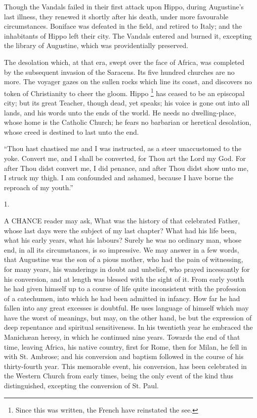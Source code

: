 Though the Vandals failed in their first attack upon Hippo, during
Augustine's last illness, they renewed it shortly after his death,
under more favourable circumstances. Boniface was defeated in the
field, and retired to Italy; and the inhabitants of Hippo left their
city. The Vandals entered and burned it, excepting the library of
Augustine, which was providentially preserved.

The desolation which, at that era, swept over the face of Africa,
was completed by the subsequent invasion of the Saracens. Its five
hundred churches are no more. The voyager gazes on the sullen rocks
which line its coast, and discovers no token of Christianity to cheer
the gloom. Hippo \footnote{Since this was written, the French have reinstated the see.}
has ceased to be an episcopal city; but its great Teacher, though
dead, yet speaks; his voice is gone out into all lands, and his words
unto the ends of the world. He needs no dwelling-place, whose home is
the Catholic Church; he fears no barbarian or heretical desolation,
whose creed is destined to last unto the end.


``Thou hast chastised me and I was instructed, as a steer
unaccustomed to the yoke. Convert me, and I shall be converted, for
Thou art the Lord my God. For after Thou didst convert me, I did
penance, and after Thou didst show unto me, I struck my thigh. I am
confounded and ashamed, because I have borne the reproach of my
youth.''

1.

A CHANCE reader may ask, What was the history
of that celebrated Father, whose last days were the subject of my last
chapter? What had his life been, what his early years, what his
labours? Surely he was no ordinary man, whose end, in all its
circumstances, is so impressive. We may answer in a few words, that
Augustine was the son of a pious mother, who had the pain of
witnessing, for many years, his wanderings in doubt and unbelief, who
prayed incessantly for his conversion, and at length was blessed with
the sight of it. From early youth he had given himself up to a course
of life quite inconsistent with the profession of a catechumen, into
which he had been admitted in infancy. How far he had fallen into any
great excesses is doubtful. He uses language of himself which may have
the worst of meanings, but may, on the other hand, be but the
expression of deep repentance and spiritual sensitiveness. In
his twentieth year he embraced the Manichæan heresy, in which he
continued nine years. Towards the end of that time, leaving Africa,
his native country, first for Rome, then for Milan, he fell in with
St. Ambrose; and his conversion and baptism followed in the course of
his thirty-fourth year. This memorable event, his conversion, has been
celebrated in the Western Church from early times, being the only
event of the kind thus distinguished, excepting the conversion of St.
Paul.

